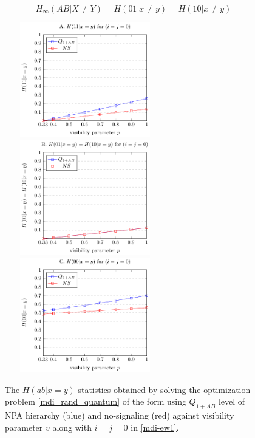 \documentclass[doublecol,linenumbers]{epl2} %
\begin{document}
\begin{equation}
H_\infty(AB|X\neq Y)=H(01|x\neq y)=H(10|x\neq y)
\end{equation}
\begin{figure}[t]
\centering
\includegraphics[height=5cm,width=7cm]{xisy1.pdf}
\includegraphics[height=5cm,width=7cm]{xisy2.pdf}
\includegraphics[height=5cm,width=7cm]{xisy3.pdf}

\caption{The $H(ab|x=y)$ statistics obtained by solving the optimization problem \ref{mdi_rand_quantum} of the form using $Q_{1+AB}$ level of NPA hierarchy (blue) and no-signaling (red) against visibility parameter $v$ along with $i=j=0$ in \ref{mdi-ew1}.}\label{plot2}
\end{figure}
\end{document}

